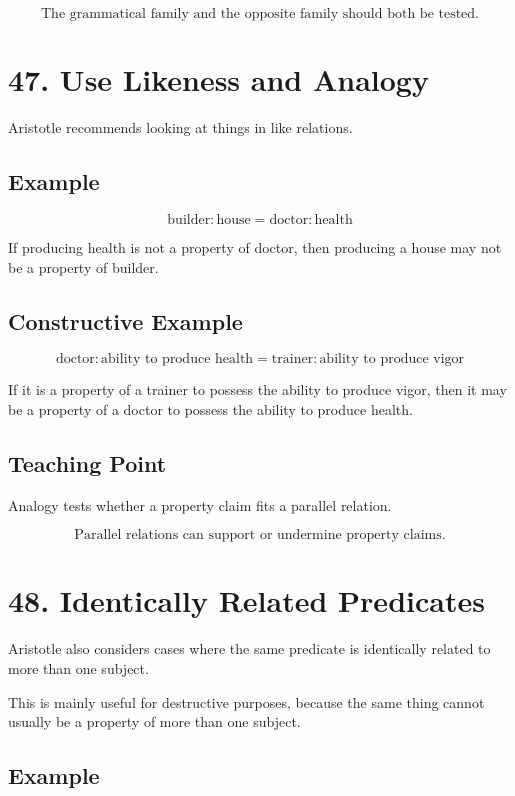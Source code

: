 \documentclass[12pt]{article}
\begin{document}
\[
\boxed{
\text{The grammatical family and the opposite family should both be tested.}
}
\]

\section*{47. Use Likeness and Analogy}

Aristotle recommends looking at things in like relations.

\subsection*{Example}

\[
\text{builder}:\text{house}
=
\text{doctor}:\text{health}
\]

If producing health is not a property of doctor, then producing a house may not
be a property of builder.

\subsection*{Constructive Example}

\[
\text{doctor}:\text{ability to produce health}
=
\text{trainer}:\text{ability to produce vigor}
\]

If it is a property of a trainer to possess the ability to produce vigor, then
it may be a property of a doctor to possess the ability to produce health.

\subsection*{Teaching Point}

Analogy tests whether a property claim fits a parallel relation.

\[
\boxed{
\text{Parallel relations can support or undermine property claims.}
}
\]

\section*{48. Identically Related Predicates}

Aristotle also considers cases where the same predicate is identically related
to more than one subject.

This is mainly useful for destructive purposes, because the same thing cannot
usually be a property of more than one subject.

\subsection*{Example}
\end{document}
